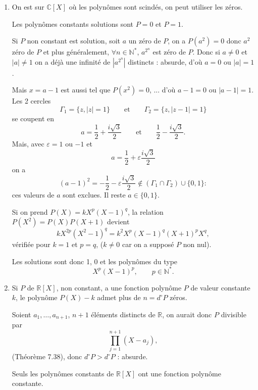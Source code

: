 \begin{enumerate}[label=\arabic*.,leftmargin=2.2em,itemsep=1.1em]
Comme
\[
\pi_n(z)=\frac{z^{2n}+1}{z^n}
\]
s'annule en
\[
z_k=e^{i\pi/(2n)+ik\pi/n},\qquad k=0,1,\ldots,2n-1
\]
et que pour $k=0,1,\ldots,n-1$,
\[
R(z_k)=z_k+\overline z_k=2\cos\theta_k
\]
avec
\[
\theta_k=\frac\pi{2n}+\frac{k\pi}{n},
\]
$n$ valeurs distinctes de $[0,\pi]$, on a $n$ zéros distincts de $P_n$ de degré $n$ dans $[-2,2]$ : les racines de $P_n$ sont bien réelles et dans $[-2,2]$, ce sont les
\[
2\cos\left(\frac\pi{2n}+\frac{k\pi}{n}\right),\qquad k=0,1,\ldots,n-1.
\]

\item On est sur $\mathbb C[X]$ où les polynômes sont scindés, on peut utiliser les zéros.

Les polynômes constants solutions sont $P=0$ et $P=1$.

Si $P$ non constant est solution, soit $a$ un zéro de $P$, on a $P(a^2)=0$ donc $a^2$ zéro de $P$ et plus généralement, $\forall n\in\mathbb N^*$, $a^{2^n}$ est zéro de $P$. Donc si $a\ne0$ et $|a|\ne1$ on a déjà une infinité de $|a^{2^n}|$ distincts : absurde, d'où $a=0$ ou $|a|=1$.

Mais $x=a-1$ est aussi tel que $P(x^2)=0$, ... d'où $a-1=0$ ou $|a-1|=1$. Les 2 cercles
\[
\Gamma_1=\{z,|z|=1\}\qquad\text{et}\qquad\Gamma_2=\{z,|z-1|=1\}
\]
se coupent en
\[
a=\frac12+\frac{i\sqrt3}{2}\qquad\text{et}\qquad\frac12-\frac{i\sqrt3}{2}.
\]
Mais, avec $\varepsilon=1$ ou $-1$ et
\[
a=\frac12+\varepsilon\frac{i\sqrt3}{2}
\]
on a
\[
(a-1)^2=-\frac12-\varepsilon\frac{i\sqrt3}{2}\notin(\Gamma_1\cap\Gamma_2)\cup\{0,1\} :
\]
ces valeurs de $a$ sont exclues. Il reste $a\in\{0,1\}$.

Si on prend $P(X)=kX^p(X-1)^q$, la relation $P(X^2)=P(X)P(X+1)$ devient
\[
kX^{2p}(X^2-1)^q=k^2X^p(X-1)^q(X+1)^pX^q,
\]
vérifiée pour $k=1$ et $p=q$, ($k\ne0$ car on a supposé $P$ non nul).

Les solutions sont donc 1, 0 et les polynômes du type
\[
X^p(X-1)^p,\qquad p\in\mathbb N^*.
\]

\item Si $P$ de $\mathbb R[X]$, non constant, a une fonction polynôme $P$ de valeur constante $k$, le polynôme $P(X)-k$ admet plus de $n=d^\circ P$ zéros.

Soient $a_1,\ldots,a_{n+1}$, $n+1$ éléments distincts de $\mathbb R$, on aurait donc $P$ divisible par
\[
\prod_{j=1}^{n+1}(X-a_j),
\]
(Théorème 7.38), donc $d^\circ P>d^\circ P$ : absurde.

Seuls les polynômes constants de $\mathbb R[X]$ ont une fonction polynôme constante.


\end{enumerate}
